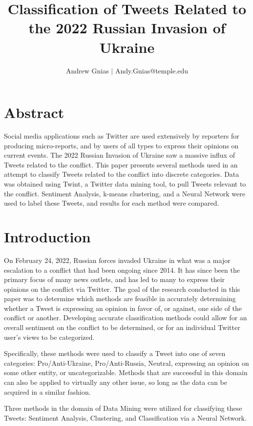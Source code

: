 \documentclass[12pt,letterpaper,oneside,titlepage]{article}
\title{Classification of Tweets Related to the 2022 Russian Invasion of Ukraine}
\author{Andrew Gnias $|$ Andy.Gnias@temple.edu}
\begin{document}
\maketitle

\section{Abstract}\label{sec:abstract}

Social media applications such as Twitter are used extensively by reporters for producing micro-reports, and by users of
all types to express their opinions on current events. 
The 2022 Russian Invasion of Ukraine saw a massive influx of Tweets related to the conflict.
This paper presents several methods used in an attempt to classify Tweets related to the conflict into discrete
categories.
Data was obtained using Twint, a Twitter data mining tool, to pull Tweets relevant to the conflict.
Sentiment Analysis, k-means clustering, and a Neural Network were used to label these Tweets, and results
for each method were compared.

\section{Introduction}\label{sec:introduction}

On February 24, 2022, Russian forces invaded Ukraine in what was a major escalation to a conflict that had been ongoing since 2014\cite{ukr}.
It has since been the primary focus of many news outlets, and has led to many to express their opinions on the conflict via Twitter. 
The goal of the research conducted in this paper was to determine which methods are feasible in accurately determining whether a 
Tweet is expressing an opinion in favor of, or against, one side of the conflict or another. 
Developing accurate classification methods could allow for an overall sentiment on the conflict to be determined, or for 
an individual Twitter user's views to be categorized.

Specifically, these methods were used to classify a Tweet into one of seven categories: 
Pro/Anti-Ukraine, Pro/Anti-Russia, Neutral, expressing an opinion on some other entity, or uncategorizable. 
Methods that are successful in this domain can also be applied to virtually any other issue, so long as the data can be acquired in a similar fashion. 

Three methods in the domain of Data Mining were utilized for classifying these Tweets: Sentiment Analysis, Clustering, and Classification via a Neural Network.
\end{document}
